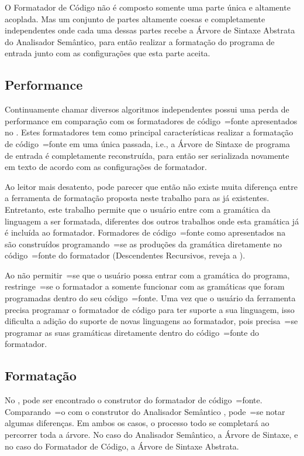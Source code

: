 O Formatador de Código não é composto somente uma parte única e
altamente acoplada.
Mas  um conjunto de partes altamente coesas e
completamente independentes onde cada uma dessas partes recebe a Árvore de Sintaxe Abstrata do Analisador Semântico,
para então realizar a formatação do programa de entrada junto com as configurações que esta parte aceita.


\subsection{Performance}
\label{performanceDoFormator}

Continuamente chamar diversos algoritmos independentes possui uma perda de performance em comparação com os formatadores de código~=fonte apresentados no .
Estes formatadores tem como principal características realizar a formatação de código~=fonte em uma única passada,
i.e.,
a Árvore de Sintaxe de programa de entrada é completamente reconstruída,
para então ser serializada novamente em texto de acordo com as configurações de formatador.

Ao leitor mais desatento,
pode parecer que então não existe muita diferença entre a ferramenta de formatação proposta neste trabalho para as já existentes.
Entretanto,
este trabalho permite que o usuário entre com a gramática da linguagem a ser formatada,
diferentes dos outros trabalhos onde esta gramática já é incluída ao formatador.
Formadores de código~=fonte como apresentados na  são construídos programando~=se as produções da gramática diretamente no código~=fonte do formatador (Descendentes Recursivos,
reveja a ).

Ao não permitir~=se que o usuário possa entrar com a gramática do programa,
restringe~=se o formatador a somente funcionar com as gramáticas que foram programadas dentro do seu código~=fonte.
Uma vez que o usuário da ferramenta precisa programar o formatador de código para ter suporte a sua linguagem,
isso dificulta a adição do suporte de novas linguagens ao formatador,
pois precisa~=se programar as suas gramáticas diretamente dentro do código~=fonte do formatador.


\subsection{Formatação}

No ,
pode ser encontrado o construtor do formatador de código~=fonte.
Comparando~=o com o construtor do Analisador Semântico ,
pode~=se notar algumas diferenças.
Em ambos os casos,
o processo todo se completará ao percorrer toda a árvore.
No caso do Analisador Semântico,
a Árvore de Sintaxe,
e no caso do Formatador de Código,
a Árvore de Sintaxe Abstrata.

